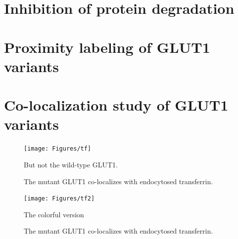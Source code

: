 \section{Inhibition of protein degradation}


\section{Proximity labeling of GLUT1 variants}

\section{Co-localization study of GLUT1 variants}
\begin{figure}[h]
\centering
\texttt{[image: Figures/tf]}
\caption{The mutant GLUT1 co-localizes with endocytosed transferrin.}
\vspace*{-3mm}
\small \justify
But not the wild-type GLUT1.
\label{fig:tf}
\end{figure}

\begin{figure}[h]
\centering
\texttt{[image: Figures/tf2]}
\caption{The mutant GLUT1 co-localizes with endocytosed transferrin.}
\vspace*{-3mm}
\small \justify
The colorful version
\label{fig:tf2}
\end{figure}
